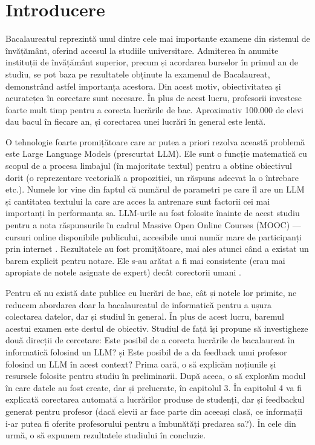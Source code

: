 \chapter{Introducere}
\begingroup
\fontsize{11pt}{13pt}\selectfont
Bacalaureatul reprezintă unul dintre cele mai importante examene din sistemul de învățământ, oferind accesul la studiile universitare.
Admiterea în anumite instituții de învățământ superior, precum și acordarea burselor în primul an de studiu, se pot baza pe rezultatele obținute la examenul de Bacalaureat, demonstrând astfel importanța acestora.
Din acest motiv, obiectivitatea și acuratețea în corectare sunt necesare.
În plus de acest lucru, profesorii investesc foarte mult timp pentru a corecta lucrările de bac. Aproximativ 100.000 de elevi dau bacul în fiecare an, și corectarea unei lucrări în general este lentă.

O tehnologie foarte promițătoare care ar putea a priori rezolva această problemă este Large Language Models (prescurtat LLM). Ele sunt o funcție matematică cu scopul de a procesa limbajul (în majoritate textul) pentru a obține obiectivul dorit (o reprezentare vectorială a propoziției, un răspuns adecvat la o întrebare etc.).
Numele lor vine din faptul că numărul de parametri pe care îl are un LLM și cantitatea textului la care are acces la antrenare sunt factorii cei mai importanți în performanța sa.
LLM-urile au fost folosite înainte de acest studiu pentru a nota răspunsurile în cadrul Massive Open Online Courses (MOOC) — cursuri online disponibile publicului, accesibile unui număr mare de participanți prin internet \cite{golchin}.
Rezultatele au fost promițătoare, mai ales atunci când a existat un barem explicit pentru notare. Ele s-au arătat a fi mai consistente (erau mai apropiate de notele asignate de expert) decât corectorii umani \cite{golchin}.

Pentru că nu există date publice cu lucrări de bac, cât și notele lor primite, ne reducem abordarea doar la bacalaureatul de informatică pentru a ușura colectarea datelor, dar și studiul în general.
În plus de acest lucru, baremul acestui examen este destul de obiectiv.
Studiul de față își propune să investigheze două direcții de cercetare:
Este posibil de a corecta lucrările de bacalaureat în informatică folosind un LLM? și
Este posibil de a da feedback unui profesor folosind un LLM în acest context?
Prima oară, o să explicăm noțiunile și resursele folosite pentru studiu în preliminarii. După aceea, o să explorăm modul în care datele au fost create, dar și prelucrate, în capitolul 3.
În capitolul 4 va fi explicată corectarea automată a lucrărilor produse de studenți, dar și feedbackul generat pentru profesor
(dacă elevii ar face parte din aceeași clasă, ce informații i-ar putea fi oferite profesorului pentru a îmbunătăți predarea sa?).
În cele din urmă, o să expunem rezultatele studiului în concluzie.

\endgroup